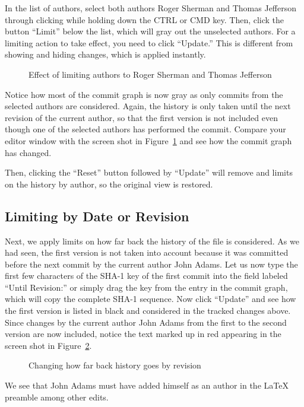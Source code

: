In the list of authors, select both authors Roger Sherman and Thomas Jefferson through clicking while holding down the CTRL or CMD key.  Then, click the button ``Limit'' below the list, which will gray out the unselected authors.  For a limiting action to take effect, you need to click ``Update.''  This is different from showing and hiding changes, which is applied instantly.
\begin{figure}[t]
\centering
{}
\caption{Effect of limiting authors to Roger Sherman and Thomas Jefferson} \label{fig:limit-authors}
\end{figure}
Notice how most of the commit graph is now gray as only commits from the selected authors are considered.  Again, the history is only taken until the next revision of the current author, so that the first version is not included even though one of the selected authors has performed the commit.  Compare your editor window with the screen shot in Figure~\ref{fig:limit-authors} and see how the commit graph has changed.

Then, clicking the ``Reset'' button followed by ``Update'' will remove and limits on the history by author, so the original view is restored.

\subsection{Limiting by Date or Revision}

Next, we apply limits on how far back the history of the file is considered.  As we had seen, the first version is not taken into account because it was committed before the next commit by the current author John Adams.  Let us now type the first few characters  of the SHA-1 key of the first commit into the field labeled ``Until Revision:'' or simply drag the key from the entry in the commit graph, which will copy the complete SHA-1 sequence.  Now click ``Update'' and see how the first version is listed in black and considered in the tracked changes above.  Since changes by the current author John Adams from the first to the second version are now included, notice the text marked up in red appearing in the screen shot in Figure~\ref{fig:limit-rev}.
\begin{figure}[t]
\centering
{}
\caption{Changing how far back history goes by revision} \label{fig:limit-rev}
\end{figure}
We see that John Adams must have added himself as an author in the LaTeX preamble among other edits.

